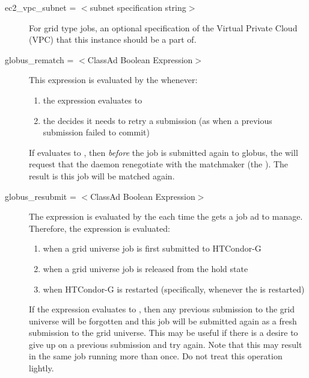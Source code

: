 \begin{description}

\label{condor-submit-ec2-vpc-subnet}
\item[ec2\_vpc\_subnet = $<$subnet specification string$>$]
For grid type  jobs, 
an optional specification of the Virtual Private Cloud (VPC) that
this instance should be a part of.



\label{condor-submit-globus-rematch}
\item[globus\_rematch = $<$ClassAd Boolean Expression$>$]
\label{condor-submit-globus-rematch}
This expression is evaluated by the  whenever:
\begin{enumerate}
\item
   the  expression evaluates to 
\item
   the  decides it needs to retry a submission
   (as when a previous submission failed to commit)
\end{enumerate}
If  evaluates to ,
then \emph{before} the job is submitted again to globus,
the  will request that the 
daemon renegotiate
with the matchmaker (the ).
The result is this job will be matched again.


\label{condor-submit-globus-resubmit}
\item[globus\_resubmit = $<$ClassAd Boolean Expression$>$]
The expression is evaluated by the  each time
the  gets a job ad to manage.
Therefore, the expression is evaluated:
\begin{enumerate}
\item
   when a grid universe job is first submitted to HTCondor-G
\item
   when a grid universe job is released from the hold state
\item
   when HTCondor-G is restarted (specifically, whenever the 
   is restarted)
\end{enumerate}
If the expression evaluates to ,
then any previous submission to the grid universe will be
forgotten and this job will be submitted again as a fresh submission to
the grid universe.
This may be useful if there is a desire to give up on a
previous submission and try again.
Note that this may result in the same job running more than
once.  Do not treat this operation lightly.


\end{description}
